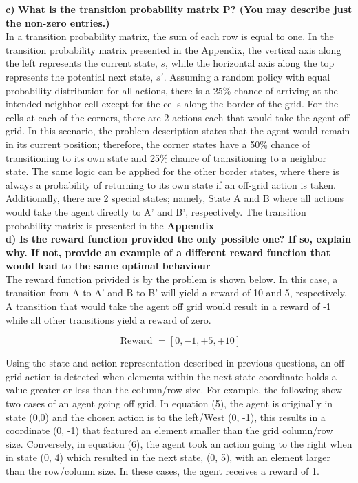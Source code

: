 \documentclass[11pt]{article}
\begin{document}
\noindent
\textbf{c)}
\noindent
\textbf{What is the transition probability matrix P? (You may describe just
the non-zero entries.)}
\\

\noindent
In a transition probability matrix, the sum of each row is equal to one. In the
transition probability matrix presented in the Appendix, the vertical axis along
the left represents the current state, $s$, while the horizontal axis along the
top represents the potential next state, $s'$. Assuming a random policy with
equal probability distribution for all actions, there is a 25\% chance of
arriving at the intended neighbor cell except for the cells along the border of
the grid. For the cells at each of the corners, there are 2 actions each that
would take the agent off grid. In this scenario, the problem description states
that the agent would remain in its current position; therefore, the corner
states have a 50\% chance of transitioning to its own state and 25\% chance of
transitioning to a neighbor state. The same logic can be applied for the other
border states, where there is always a probability of returning to its own state
if an off-grid action is taken. Additionally, there are 2 special states;
namely, State A and B where all actions would take the agent directly to A' and
B', respectively. The transition probability matrix is presented in the
\textbf{Appendix} \\

\noindent
\textbf{d)}
\noindent
\textbf{Is the reward function provided the only possible one? If so, explain
why. If not, provide an example of a different reward function that would lead
to the same optimal behaviour}
\\

\noindent
The reward function privided is by the problem is shown below. In this case, a
transition from A to A' and B to B' will yield a reward of 10 and 5,
respectively. A transition that would take the agent off grid would result in a
reward of -1 while all other transitions yield a reward of zero. 

\begin{equation}
\text { Reward }={[0,-1,+5,+10]}
\end{equation}

\noindent
Using the state and action representation described in previous questions, an
off grid action is detected when elements within the next state coordinate holds
a value greater or less than the column/row size. For example, the following
show two cases of an agent going off grid. In equation (5), the agent is
originally in state (0,0) and the chosen action is to the left/West (0, -1),
this results in a coordinate (0, -1) that featured an element smaller than the
grid column/row size. Conversely, in equation (6), the agent took an action
going to the right when in state (0, 4) which resulted in the next state, (0,
5), with an element larger than the row/column size. In these cases, the agent
receives a reward of 1.
\end{document}
